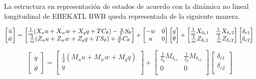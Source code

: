 La estructura en representación de estados de acuerdo con la dinámica no lineal longitudinal de EHEKATL BWB queda representada de la siguiente manera. 

\begin{equation}
    \begin{bmatrix}
        \dot u \\
        \dot w
    \end{bmatrix}
    =
    \begin{bmatrix}
        \frac{1}{m} (X_u u + X_w w + X_q q + T C_\theta) - \frac{g}{V} S_\theta \\
        \frac{1}{m} (Z_u u + Z_w w + Z_q q + T S_\theta) + \frac{g}{V} C_\theta
    \end{bmatrix}
    +
    \begin{bmatrix}
    - w & 0 \\
    u & 0
    \end{bmatrix}
    \begin{bmatrix}
      q  \\
      \theta
    \end{bmatrix}
    +
    \begin{bmatrix}
     \frac{1}{m} X_{\delta_e1} & \frac{1}{m} X_{\delta_e2} \\
     \frac{1}{m} Z_{\delta_e1} & \frac{1}{m} Z_{\delta_e2} \\
    \end{bmatrix}
    \begin{bmatrix}
        \delta_{e1} \\
        \delta_{e2} \\
    \end{bmatrix} \nonumber\\
\end{equation}

\begin{equation}
    \begin{bmatrix}
        \dot q \\
        \dot \theta
    \end{bmatrix}
    =
    \begin{bmatrix}
        \frac{1}{y} (M_u u + M_w w + M_q q) \\
        q \\
    \end{bmatrix}
    +
    \begin{bmatrix}
     \frac{1}{I_y} M_{\delta_{e1}} & \frac{1}{I_y} M_{\delta_{e2}} \\
      0 & 0 \\
    \end{bmatrix}
    \begin{bmatrix}
        \delta_{e1} \\
        \delta_{e2} \\
    \end{bmatrix}
\end{equation}


